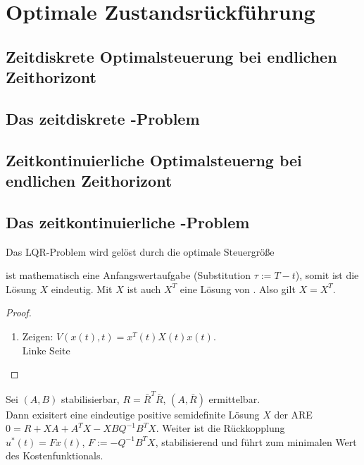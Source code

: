 \chapter{Optimale Zustandsrückführung}
\section{Zeitdiskrete Optimalsteuerung bei endlichen Zeithorizont}


\section{Das zeitdiskrete -Problem}

\section{Zeitkontinuierliche Optimalsteuerng bei endlichen Zeithorizont}
\label{sec:3_3_zeitkont_opt_endl}

\section{Das zeitkontinuierliche -Problem}

\begin{satz}
Das \ac{LQR}-Problem wird gelöst durch die optimale Steuergröße
\end{satz}
\begin{remark}
ist mathematisch eine Anfangswertaufgabe (Substitution $\tau:=T-t$), somit ist die Lösung $X$ eindeutig. Mit $X$ ist auch $X^T$ eine Lösung von . Also gilt $X=X^T$.
\end{remark}
\begin{proof}
\begin{enumerate}[label=(\alph*)]
  \item Zeigen: $V(x(t),t)=x^T(t)X(t)x(t)$.\\
  Linke Seite
\end{enumerate}
\end{proof}

\begin{satz}
Sei $(A,B)$ stabilisierbar, $R=\bar{R}^T\bar{R}$, $(A,\bar{R})$ ermittelbar.\\
Dann exisitert eine eindeutige positive semidefinite Lösung $X$ der \ac{ARE} $0=R+XA+A^TX-XBQ^{-1}B^TX$. Weiter ist die Rückkopplung $u^{\ast}(t)=Fx(t)$, $F:=-Q^{-1}B^TX$,
stabilisierend und führt zum minimalen Wert des Kostenfunktionals.
\end{satz}

